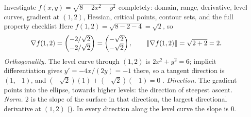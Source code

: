 \begin{worked}{Investigate $f(x,y)=\sqrt{8-2x^{2}-y^{2}}$ completely: domain, range, derivative, level curves, gradient at $(1,2)$, Hessian, critical points, contour sets, and the full property checklist}
Here $f(1,2)=\sqrt{8-2-4}=\sqrt2$, so
\[
  \nabla f(1,2)=\begin{pmatrix}-2/\sqrt2\\-2/\sqrt2\end{pmatrix}
  =\begin{pmatrix}-\sqrt2\\-\sqrt2\end{pmatrix},
  \qquad
  \lVert\nabla f(1,2)\rVert=\sqrt{2+2}=2 .
\]
\emph{Orthogonality.} The level curve through $(1,2)$ is
$2x^{2}+y^{2}=6$; implicit differentiation gives
$y'=-4x/(2y)=-1$ there, so a tangent direction is $(1,-1)$, and
$(-\sqrt2)(1)+(-\sqrt2)(-1)=0$ \checkmark.
\emph{Direction.} The gradient points into the ellipse, towards higher
levels: the direction of steepest ascent. \emph{Norm.} $2$ is the slope of
the surface in that direction, the largest directional derivative at
$(1,2)$ (). In every direction along the level curve the
slope is $0$.


\end{worked}
